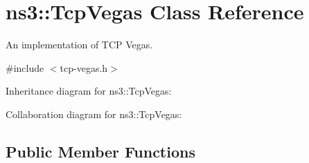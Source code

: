 \hypertarget{classns3_1_1TcpVegas}{}\section{ns3\+:\+:Tcp\+Vegas Class Reference}
\label{classns3_1_1TcpVegas}


An implementation of T\+CP Vegas.  




{\ttfamily \#include $<$tcp-\/vegas.\+h$>$}



Inheritance diagram for ns3\+:\+:Tcp\+Vegas\+:


Collaboration diagram for ns3\+:\+:Tcp\+Vegas\+:
\subsection*{Public Member Functions}
